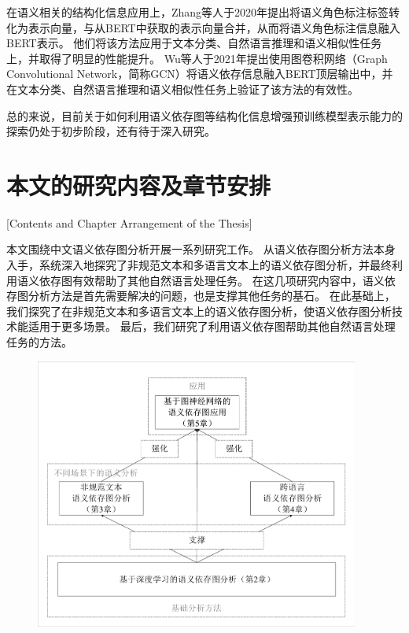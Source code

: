 在语义相关的结构化信息应用上，Zhang等人\cite{zhang-etal-2020-semantics}于2020年提出将语义角色标注标签转化为表示向量，与从BERT中获取的表示向量合并，从而将语义角色标注信息融入BERT表示。
他们将该方法应用于文本分类、自然语言推理和语义相似性任务上，并取得了明显的性能提升。
Wu等人\cite{wu-etal-2021-infusing}于2021年提出使用图卷积网络（Graph Convolutional Network，简称GCN）将语义依存信息融入BERT顶层输出中，并在文本分类、自然语言推理和语义相似性任务上验证了该方法的有效性。

总的来说，目前关于如何利用语义依存图等结构化信息增强预训练模型表示能力的探索仍处于初步阶段，还有待于深入研究。

\section{本文的研究内容及章节安排}[Contents and Chapter Arrangement of the Thesis]

本文围绕中文语义依存图分析开展一系列研究工作。
从语义依存图分析方法本身入手，系统深入地探究了非规范文本和多语言文本上的语义依存图分析，并最终利用语义依存图有效帮助了其他自然语言处理任务。
在这几项研究内容中，语义依存图分析方法是首先需要解决的问题，也是支撑其他任务的基石。
在此基础上，我们探究了在非规范文本和多语言文本上的语义依存图分析，使语义依存图分析技术能适用于更多场景。
最后，我们研究了利用语义依存图帮助其他自然语言处理任务的方法。

\begin{figure}[htbp]
    \centering
    \includegraphics[width=0.95\textwidth]{figures/section-relation.pdf}
\end{figure}

